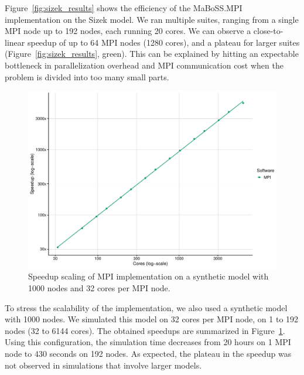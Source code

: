 \documentclass[a4paper,num-refs]{oup-contemporary}
\begin{document}
Figure~\ref{fig:sizek_results} shows the efficiency of the MaBoSS.MPI implementation on the Sizek model. We ran multiple suites, ranging from a single MPI node up to 192 nodes, each running 20 cores. We can observe a close-to-linear speedup of up to 64 MPI nodes (1280 cores), and a plateau for larger suites (Figure~\ref{fig:sizek_results}, green). This can be explained by hitting an expectable bottleneck in parallelization overhead and MPI communication cost when the problem is divided into too many small parts.

\begin{figure}%
\centering
\includegraphics[width=.8\linewidth]{Figures/synth_mpi_speedup.pdf}
\caption{Speedup scaling of MPI implementation on a synthetic model with 1000 nodes and 32 cores per MPI node.}
\label{fig:synthetic_results}
\end{figure}

To stress the scalability of the implementation, we also used a synthetic model with 1000 nodes. We simulated this model on 32 cores per MPI node, on 1 to 192 nodes (32 to 6144 cores). The obtained speedups are summarized in Figure~\ref{fig:synthetic_results}. Using this configuration, the simulation time decreases from 20 hours on 1 MPI node to 430 seconds on 192 nodes. As expected, the plateau in the speedup was not observed in simulations that involve larger models.

\end{document}
